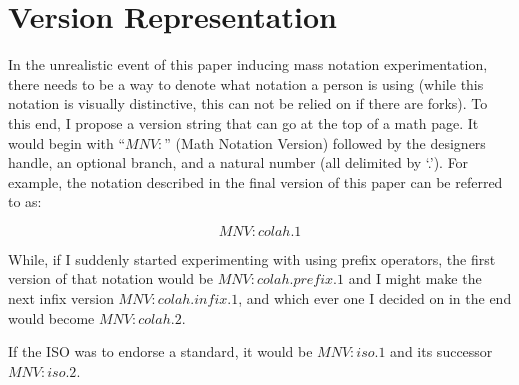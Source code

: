 % 
% 
% 
% 
% 
% 


\section{Version Representation}

In the unrealistic event of this paper inducing mass notation experimentation, there needs to be a way to denote what notation a person is using (while this notation is visually distinctive, this can not be relied on if there are forks). To this end, I propose a version string that can go at the top of a math page. It would begin with ``$MNV\!:$'' (Math Notation Version) followed by the designers handle, an optional branch, and a natural number (all delimited by `.'). For example, the notation described in the final version of this paper can be referred to as:

$$MNV\!:\!colah.1$$

While, if I suddenly started experimenting with using prefix operators, the first version of that notation would be $MNV\!:\!colah.prefix.1$ and I might make the next infix version $MNV\!:\!colah.infix.1$, and which ever one I decided on in the end would become $MNV\!:\!colah.2$.

If the ISO was to endorse a standard, it would be $MNV\!:\!iso.1$ and its successor $MNV\!:\!iso.2$.

